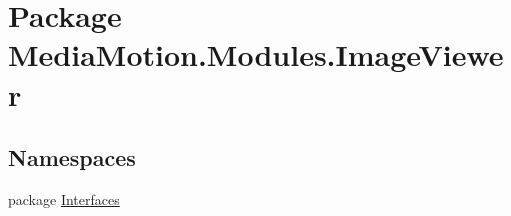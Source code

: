 \hypertarget{namespace_media_motion_1_1_modules_1_1_image_viewer}{\section{Package Media\+Motion.\+Modules.\+Image\+Viewer}
\label{namespace_media_motion_1_1_modules_1_1_image_viewer}
}
\subsection*{Namespaces}
\begin{DoxyCompactItemize}
\item 
package \hyperlink{namespace_media_motion_1_1_modules_1_1_image_viewer_1_1_interfaces}{Interfaces}
\end{DoxyCompactItemize}
